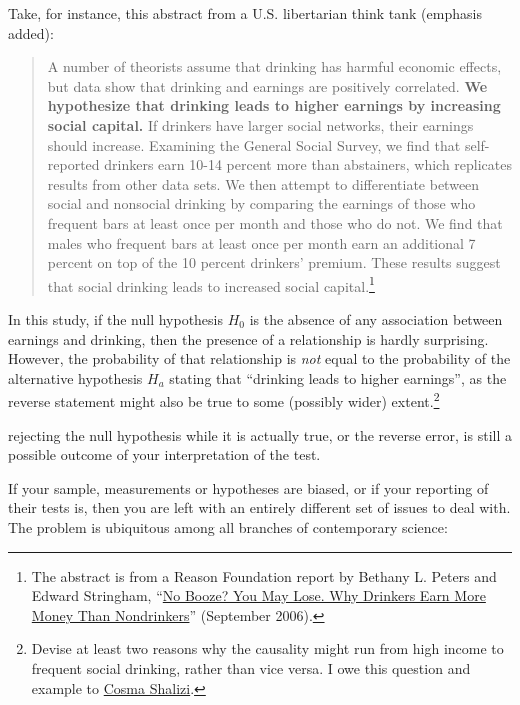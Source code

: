 Take, for instance, this abstract from a U.S. libertarian think tank (emphasis added):

\begin{quote}
	A number of theorists assume that drinking has harmful economic effects, but data show that drinking and earnings are positively correlated. \textbf{We hypothesize that drinking leads to higher earnings by increasing social capital.} If drinkers have larger social networks, their earnings should increase. Examining the General Social Survey, we find that self-reported drinkers earn 10-14 percent more than abstainers, which replicates results from other data sets. We then attempt to differentiate between social and nonsocial drinking by comparing the earnings of those who frequent bars at least once per month and those who do not. We find that males who frequent bars at least once per month earn an additional 7 percent on top of the 10 percent drinkers' premium. These results suggest that social drinking leads to increased social capital.\footnote{The abstract is from a Reason Foundation report by Bethany L. Peters and Edward Stringham, ``\href{http://reason.org/news/show/127594.html}{No Booze? You May Lose. Why Drinkers Earn More Money Than Nondrinkers}'' (September 2006).}
\end{quote}

In this study, if the null hypothesis $H_0$ is the absence of any association between earnings and drinking, then the presence of a relationship is hardly surprising. However, the probability of that relationship is \emph{not} equal to the probability of the alternative hypothesis $H_a$ stating that ``drinking leads to higher earnings'', as the reverse statement might also be true to some (possibly wider) extent.\footnote{Devise at least two reasons why the causality might run from high income to frequent social drinking, rather than vice versa. I owe this question and example to \href{https://pinboard.in/u:cshalizi/b:d54b8c984beb}{Cosma Shalizi}.}

 rejecting the null hypothesis while it is actually true, or the reverse error, is still a possible outcome of your interpretation of the test. 

 If your sample, measurements or hypotheses are biased, or if your reporting of their tests is, then you are left with an entirely different set of issues to deal with. The problem is ubiquitous among all branches of contemporary science:

